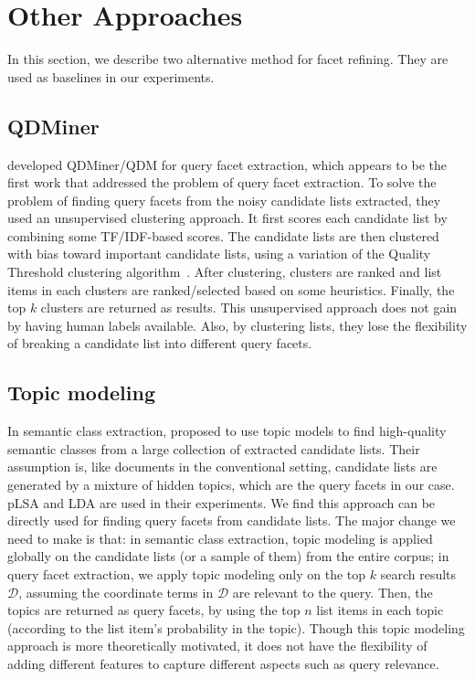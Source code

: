 \section{Other Approaches}
\label{sec:facet-other}
In this section, we describe two alternative method for facet refining. They are used as baselines in our experiments. 

\subsection{QDMiner}
\citet{dou2011finding} developed QDMiner/QDM for query facet extraction, which appears to be the first work that addressed the problem of query facet extraction.
To solve the problem of finding query facets from the noisy candidate lists extracted, they used an unsupervised clustering approach.
It first scores each candidate list by combining some TF/IDF-based scores.
The candidate lists are then clustered with bias toward important candidate lists, 
using a variation of the Quality Threshold clustering algorithm~\cite{heyer1999exploring}.
After clustering, clusters are ranked and list items in each clusters are ranked/selected based on some heuristics.
Finally, the top $k$ clusters are returned as results.
This unsupervised approach does not gain by having human labels available.
Also, by clustering lists, they lose the flexibility of breaking a candidate list into different query facets.

\subsection{Topic modeling}
In semantic class extraction, \citet{zhang2009employing} proposed to use topic models 
to find high-quality semantic classes from a large collection of extracted candidate lists.
Their assumption is, like documents in the conventional setting, candidate lists are generated by a mixture of hidden topics, which are the query facets in our case. pLSA and LDA are used in their experiments.
We find this approach can be directly used for finding query facets from candidate lists.
The major change we need to make is that: in semantic class extraction, topic modeling is applied globally on the candidate lists (or a sample of them) from the entire corpus; in query facet extraction, we apply topic modeling only on the top $k$ search results $\mathcal{D}$, assuming the coordinate terms in $\mathcal{D}$ are relevant to the query.
Then, the topics are returned as query facets, by using the top $n$ list items in each topic (according to the list item's probability in the topic).
Though this topic modeling approach is more theoretically motivated, it does not have the flexibility of adding different features to capture different aspects such as query relevance.

